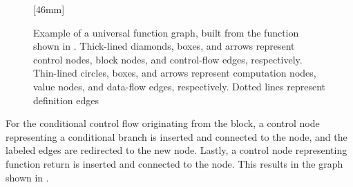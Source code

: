 \begin{figure}
  \centering

  \mbox{}%
  \hfill%
                [46mm]%
                {%
                }%
  \hfill%
                {%
                }%
  \hfill%
  \mbox{}

  \vspace{\betweensubfigures}

                {%
                  \parbox{\textwidth}{%
                    \parbox[b]{32mm}{%
                    }%
                    \hfill%
                    \parbox[b]{63mm}{%
                      \vspace*{1cm}%
                    }%
                  }%
                }%

  \caption[%
            Example of a universal function graph, built from
          ]%
          {%
            Example of a universal function graph, built from the \gls{function}
            shown in .
            Thick-lined diamonds, boxes, and arrows represent control nodes,
            block nodes, and control-flow edges, respectively.
            Thin-lined circles, boxes, and arrows represent computation nodes,
            value nodes, and data-flow edges, respectively.
            Dotted lines represent definition edges%
          }
\end{figure}%
%
For the conditional control flow originating from the 
\gls{block}, a \gls{control node} representing a conditional branch is inserted
and connected to the  \gls{node}, and the labeled \glspl{edge} are
redirected to the new \gls{node}.
%
Lastly, a \gls{control node} representing \gls{function} return is inserted and
connected to the  \gls{node}.
%
This results in the \gls{graph} shown in
.

